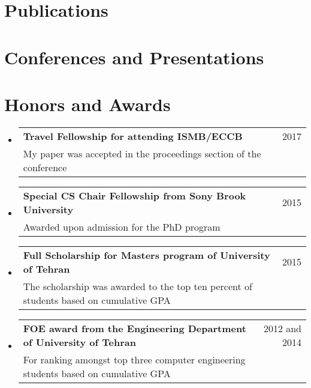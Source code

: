 \documentclass[A4,11pt]{article}
\makeatletter
\newcommand{\CVSubheading}[4]{
  \vspace{-2pt}\item
    \begin{tabular*}{0.97\textwidth}[t]{l@{\extracolsep{\fill}}r}
      \textbf{#1} & #2 \\
      \small#3 & \small #4 \\
    \end{tabular*}\vspace{-7pt}
}
\newcommand{\CVSubHeadingListStart}{\begin{itemize}[leftmargin=0.5cm, label={}]}
\newcommand{\CVSubHeadingListEnd}{\end{itemize}}
\makeatother
\begin{document}
\section{Publications}
\begin{refsection}
\nocite{wu2022detecting}
\nocite{he2022alevin}
\nocite{skoufos2022agamemnon}
\nocite{almodaresi2021puffaligner}
\nocite{zakeri2021likeforlike}
\nocite{srivastava2021accounting}
\nocite{srivastava2019alignment}
\nocite{ismb2017factorization}
\nocite{sarkar2018towards}
\nocite{almodaresi2017distribution}
\printbibliography[heading = none]
\end{refsection}

\begin{comment}
Again the title should have already been enough, but if it is necessary to add
descriptions maintain the consistency from prior sections
\end{comment}

\section{Conferences and Presentations}
\begin{refsection}
\nocite{Boots2022Poster}
\nocite{Sarkar2020}
\nocite{CedarPoster2019}
\nocite{zakeri2017poster}
\printbibliography[heading = none]
\end{refsection}

\section{Honors and Awards}
  \CVSubHeadingListStart
    \CVSubheading
      {Travel Fellowship for attending ISMB/ECCB}{2017}
      {My paper was accepted in the proceedings section of the conference}{}
    \CVSubheading
      {Special CS Chair Fellowship from Sony Brook University}{2015}
      {Awarded upon admission for the PhD program}{}
    \CVSubheading
      {Full Scholarship for Masters program of University of Tehran}{2015}
      {The scholarship was awarded to the top ten percent of students based on cumulative GPA}{}
    \CVSubheading
      {FOE award from the Engineering Department of University of Tehran}{2012 and 2014}
      {For ranking amongst top three computer engineering students based on cumulative GPA}{}
  \CVSubHeadingListEnd
\end{document}
